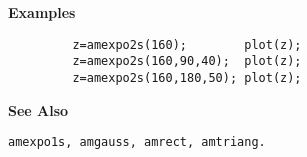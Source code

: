 {\bf \large {}\selectfont Examples}
\begin{verbatim}
         z=amexpo2s(160);        plot(z);
         z=amexpo2s(160,90,40);  plot(z);
         z=amexpo2s(160,180,50); plot(z);
\end{verbatim}
\vspace*{.5cm}


{\bf \large {}\selectfont See Also}\\
\hspace*{1.5cm}
\begin{minipage}[t]{13.5cm}
\begin{verbatim}
amexpo1s, amgauss, amrect, amtriang.
\end{verbatim}
\end{minipage}

